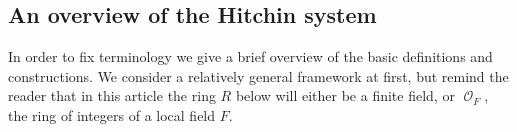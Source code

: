 \documentclass{article}
\DeclareMathOperator{\Tb}{\mathbb{T}}
\DeclareMathOperator{\Oo}{\mathcal{O}}
\newcommand{\BG}{{\mathbb{G}}}
\newcommand{\BH}{{\mathbb{H}}}
\newcommand{\BT}{{\mathbb{T}}}
\DeclareMathOperator{\Out}{Out}
\newcommand{\defeq}{\colonequals}
\theoremstyle{definition}
\newtheorem{definition}{Definition}[section]
\newtheorem{rmk}[definition]{Remark}
\theoremstyle{plain}
\begin{document}



\subsection{An overview of the Hitchin system}\label{sub:overview}

In order to fix terminology we give a brief overview of the basic definitions and constructions. We consider a relatively general framework at first, but remind the reader that in this article the ring $R$ below will either be a finite field, or $\Oo_F$, the ring of integers of a local field $F$.
\end{document}
